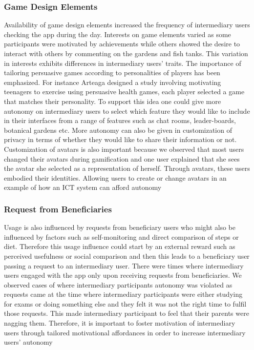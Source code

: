 \documentclass{sig-alternate}
\begin{document}
\subsubsection*{\textbf{Game Design Elements}} Availability of game design elements increased the frequency of intermediary users checking the app during the day. Interests on game elements varied as some participants were motivated by achievements while others showed the desire to interact with others by commenting on the gardens and fish tanks. This variation in interests exhibits differences in intermediary users' traits. The importance of tailoring persuasive games according to personalities of players has been emphasized\cite{orji2013:tailoring}. For instance Arteaga \cite{arteaga2010:persuasive} designed a study involving motivating teenagers to exercise using persuasive health games, each player selected a game that matches their personality. To support this idea one could give more autonomy on intermediary users to select which feature they would like to include in their interfaces from a range of features such as chat rooms, leader-boards, botanical gardens etc. More autonomy can also be given in customization of privacy in terms of whether they would like to share their information or not. Customization of avatars is also important because we observed that most users changed their avatars during gamification and one user explained that she sees the avatar she selected as a representation of herself. Through avatars, these users embodied their identities. Allowing users to create or change avatars in an example of how an ICT system can afford autonomy \cite{zhang2008:motivational}
\subsubsection*{\textbf{Request from Beneficiaries}}  
Usage is also influenced by requests from beneficiary users who might also be influenced by factors such as self-monitoring and direct comparison of steps or diet. Therefore this usage influence could start by an external reward such as perceived usefulness or social comparison and then this leads to a beneficiary user passing a request to an intermediary user. There were times where intermediary users engaged with the app only upon receiving requests from beneficiaries.  We observed cases of where intermediary participants autonomy was violated as requests came at the time where intermediary participants were either studying for exams or doing something else and they felt it was not the right time to fulfil those requests. This made intermediary participant to feel that their parents were nagging them. Therefore, it is important to foster motivation of intermediary users through tailored motivational affordances in order to increase intermediary users' autonomy\newline
\end{document}
